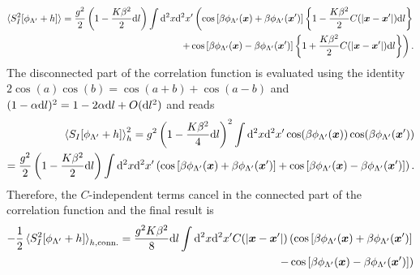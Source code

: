 \begin{align}
    \braket{S^2_I[\phi_{\Lambda'}+h]}=\frac{g^2}2\left( 1 - \frac{K\beta^2}2\mathrm d l \right)\int\mathrm d^2x\mathrm d^2x'
    \left(
        \cos\left[ \beta\phi_{\Lambda'}({\bm x})+\beta\phi_{\Lambda'}({\bm x'}) \right]\left\{ 1-\frac{K\beta^2}2C(|{\bm x}-{\bm x'}|)\mathrm d l \right\}
        \right.\\
        \left.+
        \cos\left[ \beta\phi_{\Lambda'}({\bm x})-\beta\phi_{\Lambda'}({\bm x'}) \right]\left\{ 1+\frac{K\beta^2}2C(|{\bm x}-{\bm x'}|)\mathrm d l \right\}
    \right).
\end{align}
The disconnected part of the correlation function is evaluated using the identity $2\cos(a)\cos(b)=\cos(a+b)+\cos(a-b)$ and $(1-\alpha\mathrm d l)^2 = 1-2\alpha\mathrm d l + O(\mathrm d l^2)$ and reads
\begin{align}
    \braket{S_I[\phi_{\Lambda'}+h]}_h^2
    = g^2\left( 1 - \frac{K\beta^2}4\mathrm d l \right)^2\int\mathrm d^2x\mathrm d^2x'\cos(\beta \phi_{\Lambda'}({\bm x}))\cos(\beta \phi_{\Lambda'}({\bm x'}))
    \\
    = \frac{g^2}2\left( 1 - \frac{K\beta^2}2\mathrm d l \right)\int\mathrm d^2x\mathrm d^2x'
        \left(
            \cos\left[ \beta \phi_{\Lambda'}({\bm x})+\beta \phi_{\Lambda'}({\bm x'}) \right]
            +
            \cos\left[ \beta \phi_{\Lambda'}({\bm x})-\beta \phi_{\Lambda'}({\bm x'}) \right]
        \right).
\end{align}
Therefore, the $C$-independent terms cancel in the connected part of the correlation function and the final result is
\begin{align}
    -\frac12\braket{S^2_I[\phi_{\Lambda'}+h]}_{h,{\rm conn.}} = \frac{g^2K\beta^2}8\mathrm d l\int\mathrm d^2x\mathrm d^2x'
    C(|{\bm x}-{\bm x'}|)
    \left(
        \cos\left[ \beta\phi_{\Lambda'}({\bm x})+\beta\phi_{\Lambda'}({\bm x'}) \right]
        \right.
        \\
        \left.-
        \cos\left[ \beta\phi_{\Lambda'}({\bm x})-\beta\phi_{\Lambda'}({\bm x'}) \right]
    \right)
\end{align}
